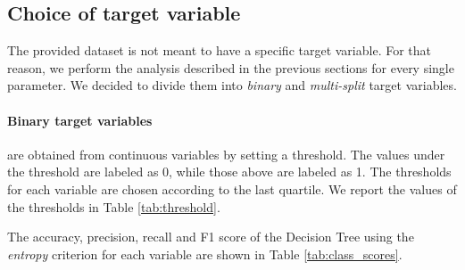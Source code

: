 \documentclass[a4paper,11pt,dvipsnames]{article}
\begin{document}
\subsection{Choice of target variable}\label{target_dt}

The provided dataset is not meant to have a specific target variable. For that reason, we perform the analysis described in the previous sections for every single parameter. We decided to divide them into \textit{binary} and \textit{multi-split} target variables. 

\paragraph{Binary target variables} are obtained from continuous variables by setting a threshold. The values under the threshold are labeled as 0, while those above are labeled as 1. The thresholds for each variable are chosen according to the last quartile. We report the values of the thresholds in Table \ref{tab:threshold}.

\begin{table}[h]
            \caption{Thresholds used for the binary split}\label{tab:threshold}
    \end{table}


The accuracy, precision, recall and F1 score of the Decision Tree using the \textit{entropy} criterion for each variable are shown in Table \ref{tab:class_scores}.
\end{document}
